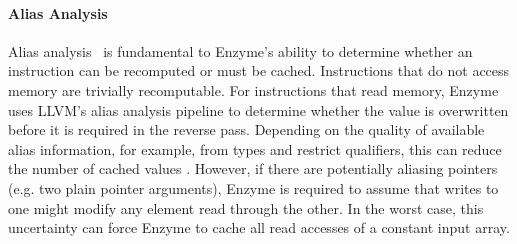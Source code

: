 \paragraph{\textbf{Alias Analysis}}
Alias analysis~\cite[Ch.~12]{AhoLaSe06} is fundamental to Enzyme's ability to determine whether an instruction can be recomputed or must be cached.
Instructions that do not access memory are trivially recomputable.
For instructions that read memory, Enzyme uses LLVM's alias analysis pipeline to determine whether the value is overwritten before it is required in the reverse pass.
%
Depending on the quality of available alias information, for example, from types and restrict qualifiers, this can reduce the number of cached values .
However, if there are potentially aliasing pointers (e.g. two plain pointer arguments), Enzyme is required to assume that writes to one might modify any element read through the other.
In the worst case, this uncertainty can force Enzyme to cache all read accesses of a constant input array.

